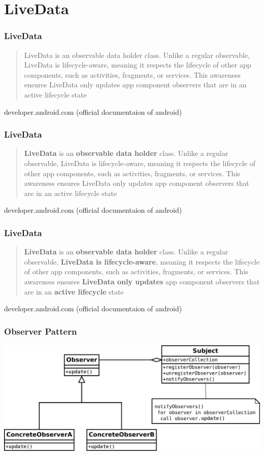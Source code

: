 \documentclass{beamer}
\begin{document}
	\section[Live Data]{LiveData}
	\begin{frame}
		\frametitle{LiveData}
\begin{quote}LiveData is an observable data holder class. Unlike a regular observable, LiveData is lifecycle-aware, meaning it respects the lifecycle of other app components, such as activities, fragments, or services. This awareness ensures LiveData only updates app component observers that are in an active lifecycle state\end{quote} developer.android.com \linebreak(official documentaion of android)
	\end{frame}
	
	\begin{frame}
		\frametitle{LiveData}
		\begin{quote}\textbf{LiveData} is an \textbf{observable data holder} class. Unlike a regular observable, LiveData is lifecycle-aware, meaning it respects the lifecycle of other app components, such as activities, fragments, or services. This awareness ensures LiveData only updates app component observers that are in an active lifecycle state\end{quote} developer.android.com \linebreak(official documentaion of android)
	\end{frame}
	
	
	\begin{frame}
		\frametitle{LiveData}
		\begin{quote}\textbf{LiveData} is an \textbf{observable data holder} class. Unlike a regular observable, \textbf{LiveData is lifecycle-aware}, meaning it respects the lifecycle of other app components, such as activities, fragments, or services. This awareness ensures \textbf{LiveData only updates} app component observers that are in an \textbf{active lifecycle} state\end{quote} developer.android.com \linebreak(official documentaion of android)
	\end{frame}
	
	\begin{frame}
	\frametitle{Observer Pattern}
	\includegraphics[width=1\textwidth]{observerpattern.png}
	\end{frame}
\end{document}
